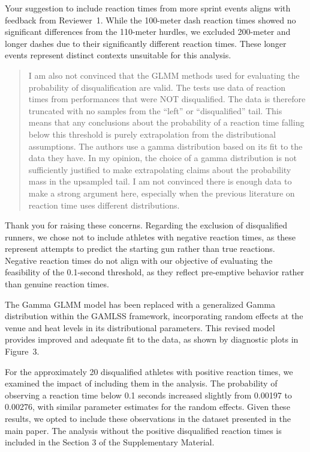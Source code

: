 \documentclass[12pt]{article}
\newenvironment{comment}%
{\begin{quotation}\noindent\small\it\color{darkblue}\ignorespaces%
}{\end{quotation}}
\begin{document}
Your suggestion to include reaction times from more sprint events aligns 
with feedback from Reviewer~1.  While the 100-meter dash reaction times 
showed no significant differences from the 110-meter hurdles, we excluded 
200-meter and longer dashes due to their significantly different reaction 
times. These longer events represent distinct contexts unsuitable for this 
analysis.


\begin{comment}
I am also not convinced that the GLMM methods used for evaluating the
probability of disqualification are valid. The tests use data of reaction times
from performances that were NOT disqualified.  The data is therefore truncated
with no samples from the “left” or “disqualified” tail. This means that any
conclusions about the probability of a reaction time falling below this
threshold is purely extrapolation from the distributional assumptions. The
authors use a gamma distribution based on its fit to the data they have. In my
opinion, the choice of a gamma distribution is not sufficiently justified to
make extrapolating claims about the probability mass in the upsampled tail. I am
not convinced there is enough data to make a strong argument here, especially
when the previous literature on reaction time uses different distributions.
\end{comment}



Thank you for raising these concerns. Regarding the exclusion of 
disqualified runners, we chose not to include athletes with negative 
reaction times, as these represent attempts to predict the starting gun 
rather than true reactions. Negative reaction times do not align with 
our objective of evaluating the feasibility of the 0.1-second threshold, 
as they reflect pre-emptive behavior rather than genuine reaction
times.


The Gamma GLMM model has been replaced with a generalized Gamma 
distribution within the GAMLSS framework, incorporating random effects 
at the venue and heat levels in its distributional parameters. This 
revised model provides improved and adequate fit to the data, as shown 
by diagnostic plots in Figure~3.


For the approximately 20 disqualified athletes with positive reaction
times, we examined the impact of including them in the analysis. The
probability of observing a reaction time below 0.1 seconds increased
slightly from 0.00197 to 0.00276, with similar parameter estimates for
the random effects. Given these results, we opted to include these
observations in the dataset presented in the main paper. The analysis without
the positive disqualified reaction times is included in the Section 3 of 
the Supplementary Material.  
\end{document}
